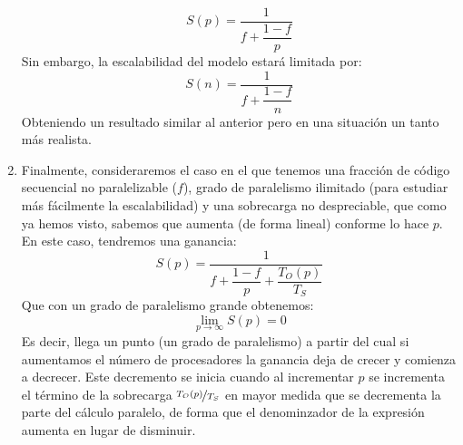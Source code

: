 \begin{enumerate}
        \begin{equation*}
            S(p) = \dfrac{1}{f+\dfrac{1-f}{p}}
        \end{equation*}
        Sin embargo, la escalabilidad del modelo estará limitada por:
        \begin{equation*}
            S(n) = \dfrac{1}{f+\dfrac{1-f}{n}}
        \end{equation*}
        Obteniendo un resultado similar al anterior pero en una situación un tanto más realista.
    \item Finalmente, consideraremos el caso en el que tenemos una fracción de código secuencial no paralelizable ($f$), grado de paralelismo ilimitado (para estudiar más fácilmente la escalabilidad) y una sobrecarga no despreciable, que como ya hemos visto, sabemos que aumenta (de forma lineal) conforme lo hace $p$. En este caso, tendremos una ganancia:
        \begin{equation*}
            S(p) = \dfrac{1}{f+\dfrac{1-f}{p}+\dfrac{T_O(p)}{T_S}}
        \end{equation*}
        Que con un grado de paralelismo grande obtenemos:
        \begin{equation*}
            \lim_{p\to\infty}S(p) = 0
        \end{equation*}
        Es decir, llega un punto (un grado de paralelismo) a partir del cual si aumentamos el número de procesadores la ganancia deja de crecer y comienza a decrecer. Este decremento se inicia cuando al incrementar $p$ se incrementa el término de la sobrecarga $\nicefrac{T_O(p)}{T_S}$ en mayor medida que se decrementa la parte del cálculo paralelo, de forma que el denominzador de la expresión aumenta en lugar de disminuir.
\end{enumerate}

